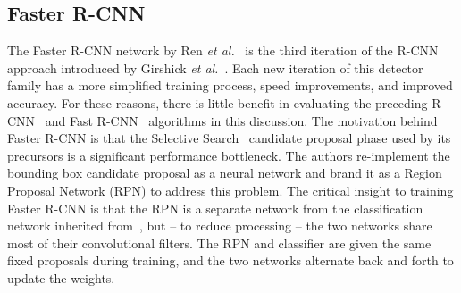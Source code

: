 \subsection{Faster R-CNN}

The Faster R-CNN network by Ren \textit{et al.}~\cite{ren_faster_2015} is the third iteration of the R-CNN approach introduced by Girshick \textit{et al.}~\cite{girshick_fast_2015, girshick_rich_2014}.  Each new iteration of this detector family has a more simplified training process, speed improvements, and improved accuracy.  For these reasons, there is little benefit in evaluating the preceding R-CNN~\cite{girshick_rich_2014} and Fast R-CNN~\cite{girshick_fast_2015} algorithms in this discussion. The motivation behind Faster R-CNN is that the Selective Search~\cite{van_de_sande_segmentation_2011} candidate proposal phase used by its precursors is a significant performance bottleneck.  The authors re-implement the bounding box candidate proposal as a neural network and brand it as a Region Proposal Network (RPN) to address this problem.  The critical insight to training Faster R-CNN is that the RPN is a separate network from the classification network inherited from~\cite{girshick_fast_2015}, but -- to reduce processing -- the two networks share most of their convolutional filters.  The RPN and classifier are given the same fixed proposals during training, and the two networks alternate back and forth to update the weights.

